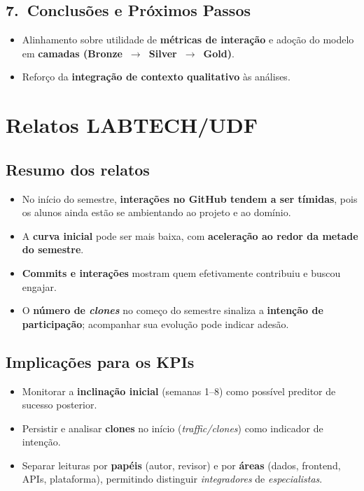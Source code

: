 \documentclass[
	12pt,
	openright,
	oneside,
	a4paper,
	brazil
]{abntex2}
\begin{document}
\begin{apendicesenv}
\section*{7.\ Conclusões e Próximos Passos}
\begin{itemize}
\item Alinhamento sobre utilidade de \textbf{métricas de interação} e adoção do modelo em \textbf{camadas (Bronze~$\rightarrow$~Silver~$\rightarrow$~Gold)}.
\item Reforço da \textbf{integração de contexto qualitativo} às análises.
\end{itemize}

\chapter{Relatos LABTECH/UDF}
\label{apendiceB}

\section*{Resumo dos relatos}
\begin{itemize}
\item No início do semestre, \textbf{interações no GitHub tendem a ser tímidas}, pois os alunos ainda estão se ambientando ao projeto e ao domínio.
\item A \textbf{curva inicial} pode ser mais baixa, com \textbf{aceleração ao redor da metade do semestre}.
\item \textbf{Commits e interações} mostram quem efetivamente contribuiu e buscou engajar.
\item O \textbf{número de \textit{clones}} no começo do semestre sinaliza a \textbf{intenção de participação}; acompanhar sua evolução pode indicar adesão.
\end{itemize}

\section*{Implicações para os KPIs}
\begin{itemize}
\item Monitorar a \textbf{inclinação inicial} (semanas 1--8) como possível preditor de sucesso posterior.
\item Persistir e analisar \textbf{clones} no início (\emph{traffic/clones}) como indicador de intenção.
\item Separar leituras por \textbf{papéis} (autor, revisor) e por \textbf{áreas} (dados, frontend, APIs, plataforma), permitindo distinguir \textit{integradores} de \textit{especialistas}.
\end{itemize}



\end{apendicesenv}
\end{document}
